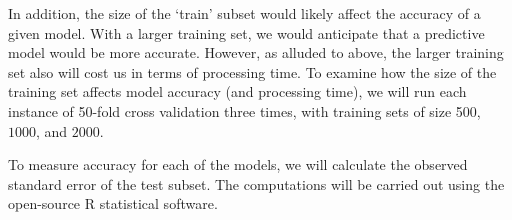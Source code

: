 \documentclass[12pt]{article}
\begin{document}
In addition, the size of the `train' subset would likely affect the accuracy of a given model.  With a larger training set, we would anticipate
that a predictive model would be more accurate.  However, as alluded to above, the larger training set also will cost us in terms of processing
time.  To examine how the size of the training set affects model accuracy (and processing time), we will run each instance of 50-fold cross
validation three times, with training sets of size 500, $1000$, and $2000$.  

To measure accuracy for each of the models, we will calculate the observed standard error of the test subset.  The computations will be carried out
using the open-source R statistical software.




\end{document}

